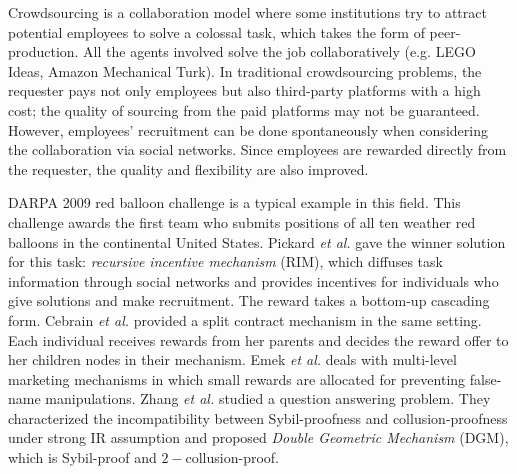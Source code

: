 \documentclass{article}
\begin{document}
Crowdsourcing \cite{howe2006rise} is a collaboration model where some institutions try to attract potential employees to solve a colossal task, which takes the form of peer-production. All the agents involved solve the job collaboratively (e.g. LEGO Ideas, Amazon Mechanical Turk). In traditional crowdsourcing problems, the requester pays not only employees but also third-party platforms with a high cost; the quality of sourcing from the paid platforms may not be guaranteed. However, employees' recruitment can be done spontaneously when considering the collaboration via social networks. Since employees are rewarded directly from the requester, the quality and flexibility are also improved.

DARPA 2009 red balloon challenge is a typical example in this field. This challenge awards the first team who submits positions of all ten weather red balloons in the continental United States. Pickard \emph{et al.}  gave the winner solution for this task: \textit{recursive incentive mechanism} (RIM), which diffuses task information through social networks and provides incentives for individuals who give solutions and make recruitment. The reward takes a bottom-up cascading form. Cebrain \emph{et al.}  provided a split contract mechanism in the same setting. Each individual receives rewards from her parents and decides the reward offer to her children nodes in their mechanism. Emek \emph{et al.}  deals with multi-level marketing mechanisms in which small rewards are allocated for preventing false-name manipulations. Zhang \emph{et al.}  studied a question answering problem. 
They characterized the incompatibility between Sybil-proofness and collusion-proofness under strong IR assumption and proposed \textit{Double Geometric Mechanism} (DGM), which is Sybil-proof and $2-$collusion-proof. 
\end{document}
